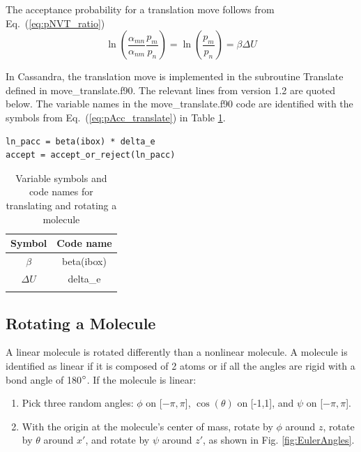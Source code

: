 The acceptance probability for a translation move follows from Eq.\ (\ref{eq:pNVT_ratio})
\begin{equation}
\label{eq:pAcc_translate}
\ln \left( \frac{\alpha_{mn}}{\alpha_{nm}} \frac{p_m}{p_n} \right) = \ln \left( \frac{p_m}{p_n} \right) = \beta \Delta U
\end{equation}

In Cassandra, the translation move is implemented in the subroutine Translate defined in move\_translate.f90. The relevant lines from version 1.2 are quoted below. The variable names in the move\_translate.f90 code are identified with the symbols from Eq.\ (\ref{eq:pAcc_translate}) in Table \ref{table:translate}.

\begin{lstlisting}[firstnumber=266, caption=move\_translate.f90, label=code:translate]
ln_pacc = beta(ibox) * delta_e
accept = accept_or_reject(ln_pacc)
\end{lstlisting}

\begin{table}
\caption{Variable symbols and code names for translating and rotating a molecule}
\label{table:translate}
\centering
\begin{tabular}{|c|c|} \hline
 {\bf Symbol} & {\bf Code name} \\ \hline
 $\beta$ & beta(ibox) \\
 $\Delta U$ & delta\_e \\
 \hline
\multicolumn{2}{c}{}
\end{tabular}
\end{table}

\subsection{Rotating a Molecule}
\label{sec:rotate}
A linear molecule is rotated differently than a nonlinear molecule. A molecule is identified as linear if it is composed of 2 atoms or if all the angles are rigid with a bond angle of 180$\degree$. If the molecule is linear: 

\begin{enumerate}
	\item Pick three random angles: $\phi$ on [$-\pi,\pi$], $\cos(\theta)$ on [-1,1], and $\psi$ on [$-\pi,\pi$].
	\item With the origin at the molecule's center of mass, rotate by $\phi$ around $z$, rotate by $\theta$ around $x'$, and rotate by $\psi$ around $z'$, as shown in Fig. \ref{fig:EulerAngles}.
\end{enumerate}

